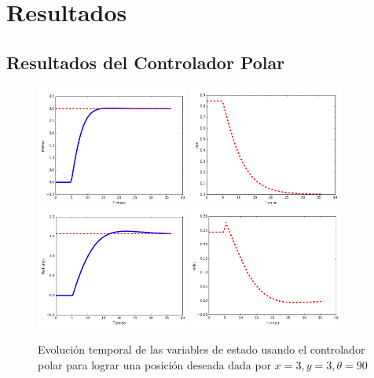 \chapter{Resultados}
\section {Resultados del Controlador Polar}
\begin{figure}%
  \centering \footnotesize
  \includegraphics[width=0.45\textwidth]{images/tvsxy_tesis.png}
  \includegraphics[width=0.45\textwidth]{images/tvsv_tesis.png}
  \includegraphics[width=0.45\textwidth]{images/tvstheta_tesis.png}
  \includegraphics[width=0.45\textwidth]{images/tvsomega_tesis.png}
  \captionsetup{font=footnotesize}
  \caption{Evolución temporal de las variables de estado usando el controlador polar 
  para lograr una posición deseada dada por $x = 3, y = 3, \theta = 90$}
  \label{f:PolarControl}
\end{figure}
